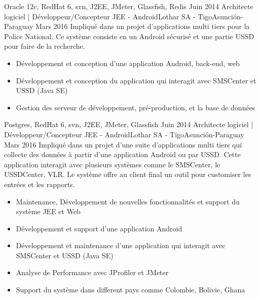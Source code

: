 \begin{experiences}
{\begin{itemize}
                      \end{itemize}
                 }
                 {Oracle 12c, RedHat 6, svn, J2EE, JMeter, Glassfish, Redis}
  \emptySeparator
  \projectexperiences
    {Juin 2014}  {Architecte logiciel | Développeur/Concepteur JEE - Android}{Lothar SA - Tigo}{Asunción-Paraguay}
    {Mars 2016}
                 {Impliqué dans un projet d'applications multi tiers pour la Police National. Ce système
                 consiste en un Android sécurisé et une partie USSD pour faire de la recherche.
                }
                 {
                      \begin{itemize}
                        \item Développement et conception d'une application Android, back-end, web
                        \item Développement et conception du application qui interagit avec SMSCenter et USSD (Java SE)
                        \item Gestion des serveur de développement, pré-production, et la base de données
                      \end{itemize}
                 }
                 {Postgres, RedHat 6, svn, J2EE, JMeter, Glassfish}
  \emptySeparator
  \projectexperiences
    {Juin 2014}  {Architecte logiciel | Développeur/Concepteur JEE - Android}{Lothar SA - Tigo}{Asunción-Paraguay}
    {Mars 2016}
                 {Impliqué dans un projet d'une suite d'applications multi tiers qui collecte des données à partir
                 d'une application Android ou par USSD. Cette application interagit avec plusieurs systèmes comme
                 le SMSCenter, le USSDCenter, VLR. Le système offre au client final un outil pour customiser les
                 entrées et les rapports.
                  }
                 {
                      \begin{itemize}
                        \item Maintenance, Développement de nouvelles fonctionnalités et support du système JEE et Web
                        \item Développement et support d'une application Android
                        \item Développement et maintenance d’une application qui interagit avec SMSCenter et USSD (Java SE)
                        \item Analyse de Performance avec JProfiler et JMeter
                        \item Support du système dans different pays comme Colombie, Bolivie, Ghana

\end{itemize}}
\end{experiences}
